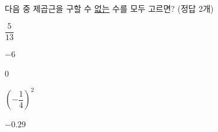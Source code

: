 다음 중 제곱근을 구할 수 \underline{없는} 수를 모두 고르면? (정답 2개)
\begin{choices32}{\rule[-3ex]{0pt}{8ex}$\dfrac{5}{13}$}{\rule[-3ex]{0pt}{8ex}$-6$}{\rule[-3ex]{0pt}{8ex}$0$}{\rule[-3ex]{0pt}{8ex}$\left(-\dfrac{1}{4}\right)^2$}{\rule[-3ex]{0pt}{8ex}$-0.29$}\end{choices32}

